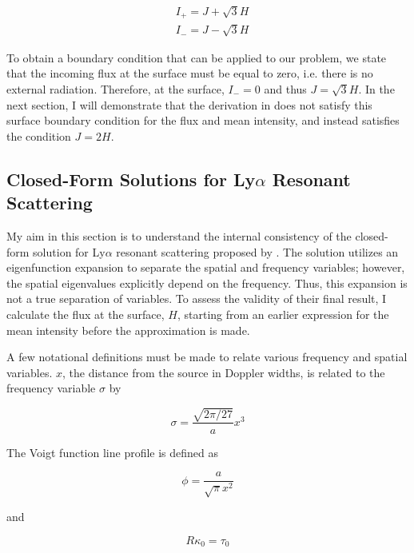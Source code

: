 \documentclass[onecolumn]{aastex63}
\begin{document}
\begin{equation}
    \begin{split}
        &I_+ = J + \sqrt{3}H \\
        &I_- = J - \sqrt{3}H
    \end{split}
\end{equation}

To obtain a boundary condition that can be applied to our problem, we state that the incoming flux at the surface must be equal to zero, i.e. there is no external radiation. Therefore, at the surface, $I_- = 0$ and thus $J=\sqrt{3}H$. In the next section, I will demonstrate that the derivation in \cite{2006ApJ...649...14D} does not satisfy this surface boundary condition for the flux and mean intensity, and instead satisfies the condition $J = 2H$.

\subsection{Closed-Form Solutions for Ly$\alpha$ Resonant Scattering}

My aim in this section is to understand the internal consistency of the closed-form solution for Ly$\alpha$ resonant scattering proposed by \cite{2006ApJ...649...14D}. The solution utilizes an eigenfunction expansion to separate the spatial and frequency variables; however, the spatial eigenvalues explicitly depend on the frequency. Thus, this expansion is not a true separation of variables. To assess the validity of their final result, I calculate the flux at the surface, $H$, starting from an earlier expression for the mean intensity before the approximation is made.

A few notational definitions must be made to relate various frequency and spatial variables. $x$, the distance from the source in Doppler widths, is related to the frequency variable $\sigma$ by 

\begin{equation} \label{sigma}
    \sigma = \frac{\sqrt{2\pi/27}}{a} x^3
\end{equation}

The Voigt function line profile is defined as 

\begin{equation} \label{lineprofile}
    \phi = \frac{a}{\sqrt{\pi} x^2}
\end{equation}

and

\begin{equation} \label{tau}
    R\kappa_0 = \tau_0
\end{equation}
\end{document}
